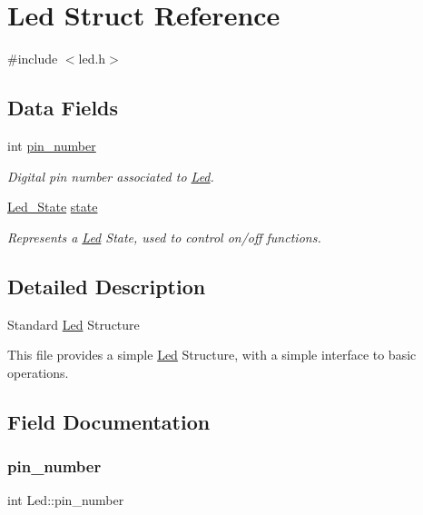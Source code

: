 \hypertarget{structLed}{}\section{Led Struct Reference}
\label{structLed}


{\ttfamily \#include $<$led.\+h$>$}

\subsection*{Data Fields}
\begin{DoxyCompactItemize}
\item 
int \mbox{\hyperlink{structLed_a8829444710298bb97fb920a42e9b33b0}{pin\+\_\+number}}
\begin{DoxyCompactList}\small\item\em Digital pin number associated to \mbox{\hyperlink{structLed}{Led}}. \end{DoxyCompactList}\item 
\mbox{\hyperlink{led_8h_a0b3e708a23789547325388652a07cc6a}{Led\+\_\+\+State}} \mbox{\hyperlink{structLed_a06ca8144f0c60cd7f6fa4733fed5006e}{state}}
\begin{DoxyCompactList}\small\item\em Represents a \mbox{\hyperlink{structLed}{Led}} State, used to control on/off functions. \end{DoxyCompactList}\end{DoxyCompactItemize}


\subsection{Detailed Description}
Standard \mbox{\hyperlink{structLed}{Led}} Structure

This file provides a simple \mbox{\hyperlink{structLed}{Led}} Structure, with a simple interface to basic operations. 

\subsection{Field Documentation}
\mbox{\label{structLed_a8829444710298bb97fb920a42e9b33b0}} 
\subsubsection{\texorpdfstring{pin\+\_\+number}{pin\_number}}
{\footnotesize\ttfamily int Led\+::pin\+\_\+number}



